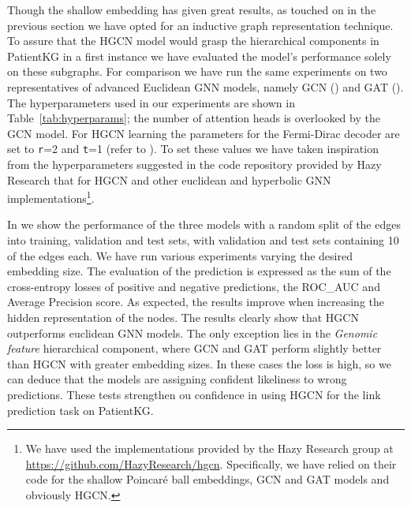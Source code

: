 Though the shallow embedding has given great results, as touched on in the previous section we have opted for an inductive graph representation technique. To assure that the HGCN model would grasp the hierarchical components in PatientKG in a first instance we have evaluated the model's performance solely on these subgraphs. For comparison we have run the same experiments on two representatives of advanced Euclidean GNN models, namely GCN () and GAT (). The hyperparameters used in our experiments are shown in Table~\ref{tab:hyperparams}; the number of attention heads is overlooked by the GCN model. For HGCN learning the parameters for the Fermi-Dirac decoder are set to \texttt{r}=2 and \texttt{t}=1 (refer to ). To set these values we have taken inspiration from the hyperparameters suggested in the code repository provided by Hazy Research that for HGCN and other euclidean and hyperbolic GNN implementations\footnote{We have used the implementations provided by the Hazy Research group at \url{https://github.com/HazyResearch/hgcn}. Specifically, we have relied on their code for the shallow Poincaré ball embeddings, GCN and GAT models and obviously HGCN.}. 


In  we show the performance of the three models with a random split of the edges into training, validation and test sets, with validation and test sets containing 10 of the edges each. We have run various experiments varying the desired embedding size. The evaluation of the prediction is expressed as the sum of the cross-entropy losses of positive and negative predictions, the ROC\_AUC and Average Precision score. As expected, the results improve when increasing the hidden representation of the nodes. The results clearly show that HGCN outperforms euclidean GNN models. The only exception lies in the \emph{Genomic feature} hierarchical component, where GCN and GAT perform slightly better than HGCN with greater embedding sizes. In these cases the loss is high, so we can deduce that the models are assigning confident likeliness to wrong predictions. These tests strengthen ou confidence in using HGCN for the link prediction task on PatientKG.
